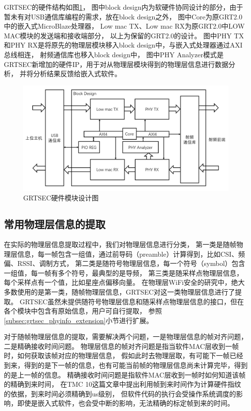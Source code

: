 		GRTSEC的硬件结构如图\ref{fig:grtsec_hw_design}，
		图中block design内为软硬件协同设计的部分，由于暂未有对USB通信库编程的需求，放在block design之外，
		图中Core为原GRT2.0中的嵌入式MicroBlaze处理器，
		Low mac TX、Low mac RX为原GRT2.0中LOW MAC模块的发送端和接收端部分，
		以上为保留的GRT2.0的设计。
		图中PHY TX和PHY RX是将原先的物理层模块移入block design中，与嵌入式处理器通过AXI总线相连，
		射频通信库也移入block design中，
		图中PHY Analyzer模式是GRTSEC新增加的硬件IP，用于对从物理层模块得到的物理层信息进行数据分析，
		并将分析结果反馈给嵌入式软件。
			\begin{figure}
				\centering
				\includegraphics[width=1.0\textwidth]{img/GRTSEC_hw_design.png}
				\caption{GRTSEC硬件模块设计图}
				\label{fig:grtsec_hw_design}
			\end{figure}


		\subsection{常用物理层信息的提取}\label{subsec:grtsec_phyinfo_substract}
		在实际的物理层信息提取过程中，我们对物理层信息进行分类，
		第一类是随帧物理层信息，每一帧包含一组值，通过前导码（preamble）计算得到，比如CSI、频偏、RSSI、调制方式，
		第二类是随符号物理层信息，每一个符号（symbol）包含一组值，每一帧有多个符号，最典型的是导频，
		第三类是随采样点物理层信息，每个采样点有一个值，比如星座点偏移向量。
		在物理层WiFi安全的研究中，绝大多数使用的是第一类，随帧物理层信息，GRTSEC对这一类物理层信息进行了提取。
		GRTSEC虽然未提供随符号物理层信息和随采样点物理层信息的接口，但在各个模块中包含有原始信息，用户可自行提取，
		参照\ref{subsec:grtsec_phyinfo_extension}小节进行扩展。

		对于随帧物理层信息的提取，需要解决两个问题，一是物理层信息的帧对齐问题，二是精确接收时间问题。
		物理层信息的帧对齐问题是指当软件MAC层收到一帧时，如何获取该帧对应的物理层信息，
		假如此时去物理层取，有可能下一帧已经到来，得到的是下一帧的信息，也有可能当前帧的物理层信息尚未计算完毕，得到的是上一帧的信息。
		精确接收时间问题是指软件MAC层收到一帧时如何知道该帧的精确到来时间，
		在TMC 10\cite{tmc10clock}这篇文章中提出利用帧到来时间作为计算硬件指纹的依据，到来时间必须精确到us级别，
		但软件代码的执行会受操作系统调度的影响，即使是嵌入式软件，也会受中断的影响，无法精确的标定帧到来的时间。

